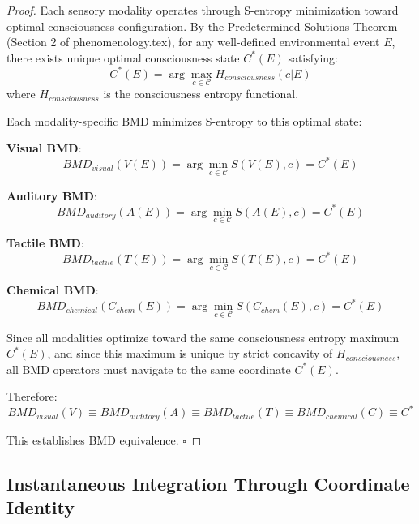 \documentclass[12pt]{article}
\theoremstyle{definition}
\theoremstyle{remark}
\begin{document}
\begin{proof}
Each sensory modality operates through S-entropy minimization toward optimal consciousness configuration. By the Predetermined Solutions Theorem (Section 2 of phenomenology.tex), for any well-defined environmental event $E$, there exists unique optimal consciousness state $C^*(E)$ satisfying:
\begin{equation}
C^*(E) = \arg\max_{c \in \mathcal{C}} H_{consciousness}(c|E)
\end{equation}
where $H_{consciousness}$ is the consciousness entropy functional.

Each modality-specific BMD minimizes S-entropy to this optimal state:

\textbf{Visual BMD}:
\begin{equation}
BMD_{visual}(V(E)) = \arg\min_{c \in \mathcal{C}} S(V(E), c) = C^*(E)
\end{equation}

\textbf{Auditory BMD}:
\begin{equation}
BMD_{auditory}(A(E)) = \arg\min_{c \in \mathcal{C}} S(A(E), c) = C^*(E)
\end{equation}

\textbf{Tactile BMD}:
\begin{equation}
BMD_{tactile}(T(E)) = \arg\min_{c \in \mathcal{C}} S(T(E), c) = C^*(E)
\end{equation}

\textbf{Chemical BMD}:
\begin{equation}
BMD_{chemical}(C_{chem}(E)) = \arg\min_{c \in \mathcal{C}} S(C_{chem}(E), c) = C^*(E)
\end{equation}

Since all modalities optimize toward the same consciousness entropy maximum $C^*(E)$, and since this maximum is unique by strict concavity of $H_{consciousness}$, all BMD operators must navigate to the same coordinate $C^*(E)$.

Therefore:
\begin{equation}
BMD_{visual}(V) \equiv BMD_{auditory}(A) \equiv BMD_{tactile}(T) \equiv BMD_{chemical}(C) \equiv C^*
\end{equation}

This establishes BMD equivalence. $\square$
\end{proof}

\subsection{Instantaneous Integration Through Coordinate Identity}
\end{document}
